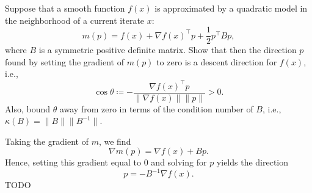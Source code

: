 \documentclass{../kin_math}
\begin{document}
\begin{questions}
  \question Suppose that a smooth function $f(x)$ is approximated by a quadratic model in the neighborhood of a current iterate $x$:
  \begin{equation*}
    m(p) = f(x) + \nabla f(x)^\top p + \frac{1}{2} p^\top B p,
  \end{equation*}
  where $B$ is a symmetric positive definite matrix. Show that then the direction $p$ found by setting the gradient of $m(p)$ to zero is a descent direction for $f(x)$, i.e.,
  \begin{equation*}
    \cos \theta \coloneqq - \frac{\nabla f(x)^\top p}{\lVert \nabla f(x) \rVert \lVert p \rVert} > 0.
  \end{equation*}
  Also, bound $\theta$ away from zero in terms of the condition number of $B$, i.e., $\kappa(B) = \lVert B \rVert \lVert B^{-1} \rVert$.
  \begin{solution}
    Taking the gradient of $m$, we find
    \begin{equation*}
      \nabla m(p) = \nabla f(x) + B p.
    \end{equation*}
    Hence, setting this gradient equal to 0 and solving for $p$ yields the direction
    \begin{equation*}
      p = -B^{-1} \nabla f(x).
    \end{equation*}
    TODO
  \end{solution}


\end{questions}
\end{document}
